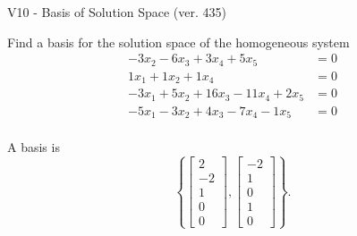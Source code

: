 \begin{exercise}
  \begin{exerciseTitle}V10 - Basis of Solution Space (ver. 435)\end{exerciseTitle}
  \begin{exerciseStatement}
    Find a basis for the solution space of the homogeneous system 
\begin{align*}
 -3 x_ 2 -6 x_ 3 + 3 x_ 4 + 5 x_ 5 &= 0  \\ 
  1 x_ 1 + 1 x_ 2 + 1 x_ 4 &= 0  \\ 
  -3 x_ 1 + 5 x_ 2 + 16 x_ 3 -11 x_ 4 + 2 x_ 5 &= 0  \\ 
  -5 x_ 1 -3 x_ 2 + 4 x_ 3 -7 x_ 4 -1 x_ 5 &= 0  \\ 
 \end{align*}


 
  \end{exerciseStatement}

  \begin{exerciseAnswer}
   A basis is   
\[\left\{\left[\begin{array}{c}
2 \\
-2 \\
1 \\
0 \\
0
\end{array}\right] , \left[\begin{array}{c}
-2 \\
1 \\
0 \\
1 \\
0
\end{array}\right]\right\}.\]

  


  \end{exerciseAnswer}
\end{exercise}